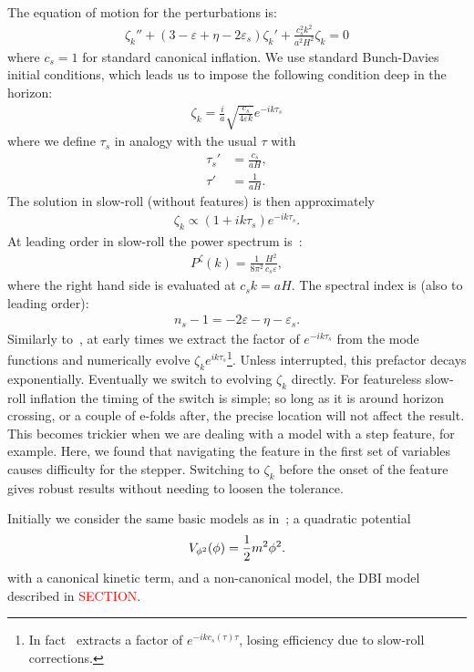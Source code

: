 The equation of motion for the perturbations is:
\begin{align}\label{modefneqn}
\zeta_k''+(3-\varepsilon+\eta-2\varepsilon_s)\zeta_k'+\frac{c_s^2k^2}{a^2H^2}\zeta_k=0
\end{align}
where $c_s=1$ for standard canonical inflation.
We use standard Bunch-Davies initial conditions,
which leads us to impose the following condition deep in the horizon:
\begin{align}\label{bd_ic}
\zeta_k = \frac{i}{a}\sqrt{\frac{c_s}{4\varepsilon k}} e^{-ik\tau_s}
\end{align}
where we define $\tau_s$
in analogy with the usual $\tau$ with
\begin{align}\label{tausdef}
    \tau_s'&=\frac{c_s}{aH},\\
    \tau'&=\frac{1}{aH}.
\end{align}
The solution in slow-roll (without features) is then approximately
\begin{align}\label{modefnsapprox}
    \zeta_k \propto (1+ik\tau_s)e^{-ik\tau_s}.
\end{align}
At leading order in slow-roll the power spectrum is~\cite{mukhanov_1999,chen_ng_0605}:
\begin{align}
P^{\zeta}(k) = \frac{1}{8\pi^2}\frac{H^2}{c_s\varepsilon},
\end{align}
where the right hand side is evaluated at $c_{s}k=aH$.
The spectral index is (also to leading order):
\begin{align}
n_s-1 = -2\varepsilon-\eta-\varepsilon_s.
\end{align}
Similarly to~\cite{Funakoshi}, at early times we extract the factor of $e^{-ik\tau_s}$ from the mode functions
and numerically evolve $\zeta_ke^{ik\tau_s}$\footnote{
    In fact~\cite{Funakoshi} extracts a factor of $e^{-ikc_s(\tau)\tau}$, losing efficiency
    due to slow-roll corrections.
}.
Unless interrupted, this prefactor decays exponentially.
Eventually we switch to evolving $\zeta_k$ directly.
For featureless slow-roll inflation the timing of the switch is simple;
so long as it is around horizon crossing, or a couple of e-folds after,
the precise location will not affect the result.
This becomes trickier when we are dealing with a model with
a step feature, for example.
Here, we found that navigating the feature in the first set of variables
causes difficulty for the stepper.
Switching to $\zeta_k$ before the onset of the feature
gives robust results without needing to loosen the tolerance.


Initially we consider the same basic models as in~\cite{Funakoshi};
a quadratic potential
\begin{align}\label{eq:quadratic_potential}
    V_{\phi^2}(\phi) = \frac{1}{2}m^2\phi^2.
\end{align}
with a canonical kinetic term,
and a non-canonical model,
the DBI model described in \textcolor{red}{SECTION}.

